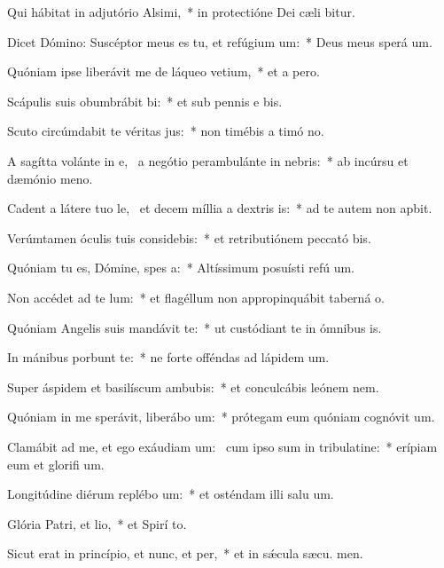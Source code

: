 \item Qui hábitat in adjutório Alsimi,~* in protectióne Dei cæli bitur.
\item Dicet Dómino: Suscéptor meus es tu, et refúgium um:~* Deus meus sperá  um.
\item Quóniam ipse liberávit me de láqueo vetium,~* et a  pero.
\item Scápulis suis obumbrábit bi:~* et sub pennis e bis.
\item Scuto circúmdabit te véritas jus:~* non timébis a timó no.
\item A sagítta volánte in e,~\pscross{} a negótio perambulánte in nebris:~* ab incúrsu et dæmónio meno.
\item Cadent a látere tuo le,~\pscross{} et decem míllia a dextris is:~* ad te autem non apbit.
\item Verúmtamen óculis tuis considebis:~* et retributiónem peccató bis.
\item Quóniam tu es, Dómine, spes a:~* Altíssimum posuísti refú um.
\item Non accédet ad te lum:~* et flagéllum non appropinquábit taberná o.
\item Quóniam Angelis suis mandávit  te:~* ut custódiant te in ómnibus  is.
\item In mánibus porbunt te:~* ne forte offéndas ad lápidem  um.
\item Super áspidem et basilíscum ambubis:~* et conculcábis leónem  nem.
\item Quóniam in me sperávit, liberábo um:~* prótegam eum quóniam cognóvit  um.
\item Clamábit ad me, et ego exáudiam um:~\pscross{} cum ipso sum in tribulatine:~* erípiam eum et glorifi um.
\item Longitúdine diérum replébo um:~* et osténdam illi salu um.
\item Glória Patri, et lio,~* et Spirí to.
\item Sicut erat in princípio, et nunc, et per,~* et in sǽcula sæcu. men.
